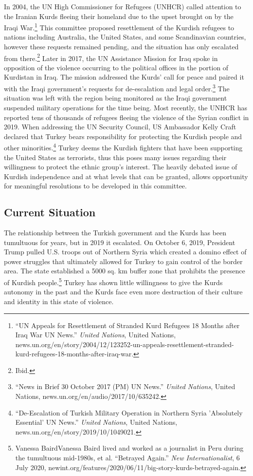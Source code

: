\documentclass[10pt, letterpaper]{article}
\begin{document}
In 2004, the UN High Commissioner for Refugees (UNHCR) called attention
to the Iranian Kurds fleeing their homeland due to the upset brought on
by the Iraqi War.\footnote{``UN Appeals for Resettlement of Stranded
  Kurd Refugees 18 Months after Iraq War  UN
  News.'' \emph{United Nations}, United Nations,
  news.un.org/en/story/2004/12/123252-un-appeals-resettlement-stranded-kurd-refugees-18-months-after-iraq-war.}
This committee proposed resettlement of the Kurdish refugees to nations
including Australia, the United States, and some Scandinavian countries,
however these requests remained pending, and the situation has only
escalated from there.\footnote{Ibid.} Later in 2017, the UN Assistance
Mission for Iraq spoke in opposition of the violence occurring to the
political offices in the portion of Kurdistan in Iraq. The mission
addressed the Kurds' call for peace and paired it with the Iraqi
government's requests for de-escalation and legal order.\footnote{``News
  in Brief 30 October 2017 (PM) \textbar{} \textbar{} UN News.''
  \emph{United Nations}, United Nations,
  news.un.org/en/audio/2017/10/635242.} The situation was left with the
region being monitored as the Iraqi government suspended military
operations for the time being. Most recently, the UNHCR has reported
tens of thousands of refugees fleeing the violence of the Syrian
conflict in 2019. When addressing the UN Security Council, US Ambassador
Kelly Craft declared that Turkey bears responsibility for protecting the
Kurdish people and other minorities.\footnote{``De-Escalation of Turkish
  Military Operation in Northern Syria 'Absolutely Essential' \textbar{}
  \textbar{} UN News.'' \emph{United Nations}, United Nations,
  news.un.org/en/story/2019/10/1049021.} Turkey deems the Kurdish
fighters that have been supporting the United States as terrorists, thus
this poses many issues regarding their willingness to protect the ethnic
group's interest. The heavily debated issue of Kurdish independence and
at what levels that can be granted, allows opportunity for meaningful
resolutions to be developed in this committee. \\

\subsection{Current Situation}

The relationship between the Turkish government and the Kurds has been
tumultuous for years, but in 2019 it escalated. On October 6, 2019,
President Trump pulled U.S. troops out of Northern Syria which created a
domino effect of power struggles that ultimately allowed for Turkey to
gain control of the border area. The state established a 5000 sq. km
buffer zone that prohibits the presence of Kurdish people.\footnote{Vanessa
  BairdVanessa Baird lived and worked as a journalist in Peru during the
  tumultuous mid-1980s, et al. ``Betrayed Again.'' \emph{New
  Internationalist}, 6 July 2020,
  newint.org/features/2020/06/11/big-story-kurds-betrayed-again.} Turkey
has shown little willingness to give the Kurds autonomy in the past and
the Kurds face even more destruction of their culture and identity in
this state of violence. \\
\end{document}
